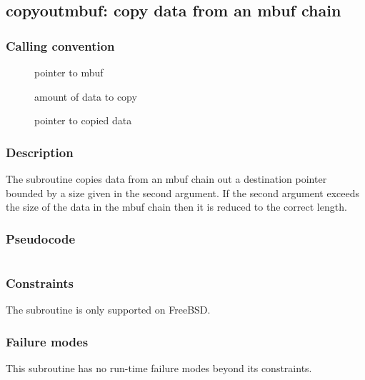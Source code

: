 \clearpage
{}
{}
\label{subr:copyoutmbuf}
\subsection*{copyoutmbuf: copy data from an mbuf chain}

\subsubsection*{Calling convention}

\begin{description}
\item[] pointer to mbuf
\item[] amount of data to copy
\item[] pointer to copied data
\end{description}

\subsubsection*{Description}

The  subroutine copies data from an mbuf
chain out a destination pointer bounded by a size given in the second
argument.  If the second argument exceeds the size of the data in the
mbuf chain then it is reduced to the correct length.

\subsubsection*{Pseudocode}

\begin{verbatim}
\end{verbatim}

\subsubsection*{Constraints}

The  subroutine is only supported on FreeBSD.

\subsubsection*{Failure modes}

This subroutine has no run-time failure modes beyond its constraints.
